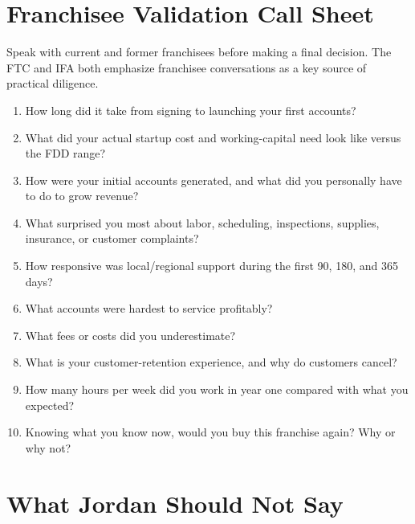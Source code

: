 \documentclass[11pt]{article}
\begin{document}
\section{Franchisee Validation Call Sheet}

Speak with current and former franchisees before making a final decision. The FTC and IFA both emphasize franchisee conversations as a key source of practical diligence.\cite{ftc-consumer-guide,ftc-deep-dive,ifa-diligence}

\begin{enumerate}
  \item How long did it take from signing to launching your first accounts?
  \item What did your actual startup cost and working-capital need look like versus the FDD range?
  \item How were your initial accounts generated, and what did you personally have to do to grow revenue?
  \item What surprised you most about labor, scheduling, inspections, supplies, insurance, or customer complaints?
  \item How responsive was local/regional support during the first 90, 180, and 365 days?
  \item What accounts were hardest to service profitably?
  \item What fees or costs did you underestimate?
  \item What is your customer-retention experience, and why do customers cancel?
  \item How many hours per week did you work in year one compared with what you expected?
  \item Knowing what you know now, would you buy this franchise again? Why or why not?
\end{enumerate}

\section{What Jordan Should Not Say}
\end{document}
